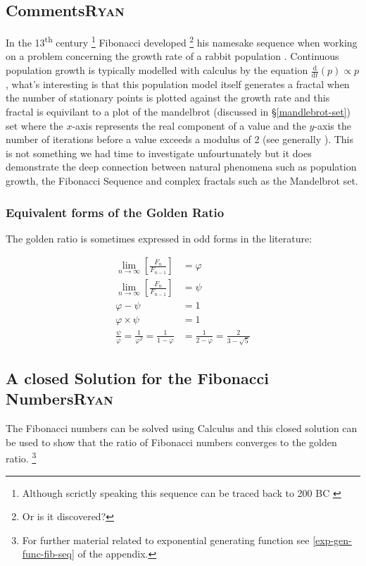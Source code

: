 \documentclass[a4paper,11pt,twoside]{article}
\begin{document}
\subsection{Comments\hfill{}\textsc{Ryan}}
\label{comment}
In the 13\textsuperscript{th} century \footnote{Although scrictly speaking this sequence can be traced back to 200 BC \cite{prasadHowFibonacciNumber2018,brownHistoryApplicationsFibonacci2019}} Fibonacci developed \footnote{Or is it discovered?}  his namesake sequence when working on a problem concerning the growth rate
of a rabbit population \cite{ronknottFibonacciNumbersGolden2016}.
Continuous population growth is typically modelled with calculus by the equation \(\frac{\mathrm{d} }{\mathrm{d} t}\left( p \right)
\propto p\) \cite[\S 11.1]{giordanoFirstCourseMathematical2014}, what's interesting is that this population model itself
generates a fractal when the number of stationary points is plotted against the
growth rate \cite[Ch. 3]{briggsTurbulentMirrorIllustrated1989}
and this fractal is equivilant to a plot of the mandelbrot (discussed in \S \ref{mandlebrot-set}) set where the \(x\)-axis represents the real component of a value and the \(y\)-axis the number of iterations before a value exceeds a modulus of 2 (see generally \cite{mullerThisEquationWill2020}). This is not
something we had time to investigate unfourtunately but it does demonstrate the deep connection between natural phenomena such as population growth, the Fibonacci Sequence and complex fractals such as the Mandelbrot set.
\subsubsection{Equivalent forms of the Golden Ratio}
\label{sec:orgfd9b0c6}
The golden ratio is sometimes expressed in odd forms in the literature:


$$\begin{aligned}
\lim_{n     \rightarrow \infty }\left[ \frac{F_n}{F_{n- 1} }  \right] &= \varphi \\
\lim_{n     \rightarrow \infty }\left[ \frac{F_n}{F_{n- 1} }  \right] &= \psi \\
\varphi - \psi &=  1 \\
\varphi \times  \psi  &= 1 \\
\frac{\psi}{\varphi}  = \frac{1}{\varphi^2} = \frac{1}{1-\varphi} &= \frac{1}{2-\varphi} = \frac{2}{3 - \sqrt{5}  }
\end{aligned}$$
\subsection{A closed Solution for the Fibonacci Numbers\hfill{}\textsc{Ryan}}
\label{solving-the-sequence}
The Fibonacci numbers can be solved  using Calculus and this closed solution can be used to show that the ratio of Fibonacci numbers converges to the golden ratio. \footnote{For further material related to exponential generating function see \ref{exp-gen-func-fib-seq} of the appendix.}
\end{document}
